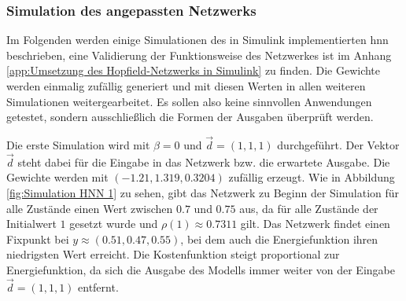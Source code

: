 \subsubsection{Simulation des angepassten Netzwerks}
\label{chap:Simulation des angepassten Netzwerks}

Im Folgenden werden einige Simulationen des in Simulink implementierten \ac{hnn} beschrieben, eine Validierung der Funktionsweise des Netzwerkes ist im Anhang \ref{app:Umsetzung des Hopfield-Netzwerks in Simulink} zu finden. Die Gewichte werden einmalig zufällig generiert und mit diesen Werten in allen weiteren Simulationen weitergearbeitet. Es sollen also keine sinnvollen Anwendungen getestet, sondern ausschließlich die Formen der Ausgaben überprüft werden.

Die erste Simulation wird mit \(\beta=0\) und \(\vec{d}=(1,1,1)\) durchgeführt. Der Vektor \(\vec{d}\) steht dabei für die Eingabe in das Netzwerk bzw. die erwartete Ausgabe. Die Gewichte werden mit \((-1.21,1.319,0.3204)\) zufällig erzeugt. Wie in Abbildung \ref{fig:Simulation HNN 1} zu sehen, gibt das Netzwerk zu Beginn der Simulation für alle Zustände einen Wert zwischen \(0.7\) und \(0.75\) aus, da für alle Zustände der Initialwert \(1\) gesetzt wurde und \(\rho(1)\approx{0.7311}\) gilt. Das Netzwerk findet einen Fixpunkt bei \(y\approx{(0.51,0.47,0.55)}\), bei dem auch die Energiefunktion ihren niedrigsten Wert erreicht. Die Kostenfunktion steigt proportional zur Energiefunktion, da sich die Ausgabe des Modells immer weiter von der Eingabe \(\vec{d}=(1,1,1)\) entfernt.

